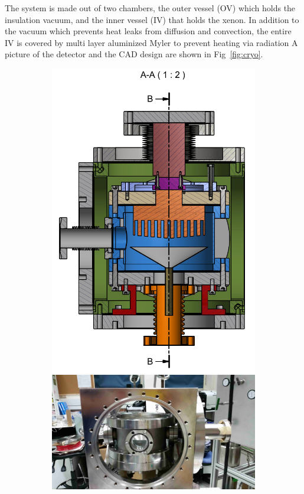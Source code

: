The system is made out of two chambers, the outer vessel (OV) which holds the insulation vacuum, and the inner vessel (IV) that holds the 
xenon. In addition to the vacuum which prevents heat leaks from diffusion and convection, the entire IV is covered by multi layer aluminized 
Myler to prevent heating via radiation A picture of the detector and the CAD design are shown in Fig~\ref{fig:cryo}. 
\begin{figure}
   \centering
    \begin{subfigure}[b]{0.25\textheight}
    \includegraphics[width=\textwidth]{cryogenic1.png}
    \includegraphics[width=\textwidth]{CryoOpen_small.jpg}

\end{subfigure}
\end{figure}
